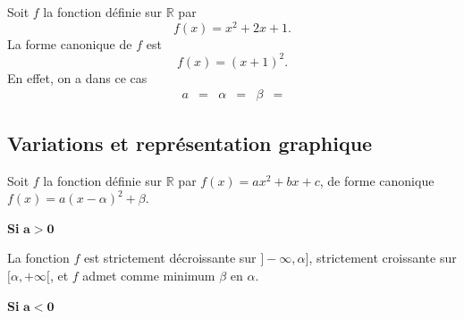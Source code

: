 \documentclass[11pt]{article}
\begin{document}
\begin{exemple}
  Soit $f$ la fonction définie sur $\mathbb{R}$ par
  \[
    f(x) = x^2 + 2x + 1.
  \]
  La forme canonique de $f$ est 
  \[
    f(x) = (x+1)^2.
  \]
  En effet, on a dans ce cas
  \begin{align*}
    a &= &
    \alpha &= &
    \beta &=
  \end{align*}
\end{exemple}

\subsection{Variations et représentation graphique}
\begin{prop}
  Soit $f$ la fonction définie sur $\mathbb{R}$ par $f(x)=ax^2+bx+c$, de forme
  canonique $f(x)=a(x-\alpha)^2+\beta$.

  \noindent
  \begin{minipage}[t]{.47\textwidth}
    \begin{center}
      {\bf Si} $\mathbf{a>0}$\vspace{.2cm}

    \end{center}
  La fonction $f$ est strictement décroissante sur $]-\infty, \alpha]$,
  strictement croissante sur $[\alpha, +\infty[$, et $f$ admet comme minimum
    $\beta$ en $\alpha$.
    \begin{center}
    \end{center}
  \end{minipage}
    \hfill
  \begin{minipage}[t]{.47\textwidth}
    \begin{center}
      {\bf Si} $\mathbf{a<0}$\vspace{.2cm}


\end{center}
\end{minipage}
\end{prop}
\end{document}
